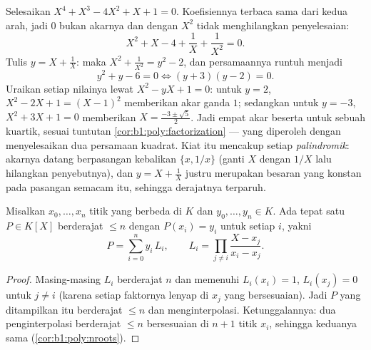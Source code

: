 \begin{example}\label{ex:b1:poly:palindrome}
Selesaikan $X^4 + X^3 - 4X^2 + X + 1 = 0$. Koefisiennya terbaca
sama dari kedua arah, jadi $0$ bukan akarnya dan  dengan
$X^2$ tidak menghilangkan penyelesaian:
\[
X^2 + X - 4 + \frac1X + \frac1{X^2} = 0 .
\]
Tulis $y = X + \frac1X$: maka $X^2 + \frac1{X^2} = y^2 - 2$, dan
persamaannya runtuh menjadi
\[
y^2 + y - 6 = 0 \iff (y + 3)(y - 2) = 0 .
\]
Uraikan setiap nilainya lewat $X^2 - yX + 1 = 0$: untuk $y = 2$, $X^2 -
2X + 1 = (X - 1)^2$ memberikan akar ganda $1$; sedangkan untuk $y = -3$,
$X^2 + 3X + 1 = 0$ memberikan $X = \frac{-3 \pm \sqrt5}2$. Jadi empat akar
beserta  untuk sebuah kuartik, sesuai tuntutan
\cref{cor:b1:poly:factorization} --- yang diperoleh dengan menyelesaikan
dua persamaan kuadrat. Kiat itu mencakup setiap 
\emph{palindromik}: akarnya datang berpasangan kebalikan $\{x, 1/x\}$
(ganti $X$ dengan $1/X$ lalu hilangkan penyebutnya), dan $y = X +
\frac1X$ justru merupakan besaran yang konstan pada pasangan semacam itu,
sehingga derajatnya terparuh.
\end{example}

\begin{theorem}\label{thm:b1:poly:lagrange}
Misalkan $x_0, \dots, x_n$ titik yang berbeda di $K$ dan $y_0, \dots, y_n
\in K$. Ada tepat satu $P \in K[X]$ berderajat $\leq n$ dengan
$P(x_i) = y_i$ untuk setiap $i$, yakni
\[
P = \sum_{i=0}^{n} y_i\, L_i,
\qquad
L_i = \prod_{j \neq i} \frac{X - x_j}{x_i - x_j} .
\]
\end{theorem}

\begin{proof}
Masing-masing $L_i$ berderajat $n$ dan memenuhi $L_i(x_i) = 1$, $L_i(x_j) =
0$ untuk $j \neq i$ (karena setiap faktornya lenyap di $x_j$ yang bersesuaian).
Jadi $P$ yang ditampilkan itu berderajat $\leq n$ dan menginterpolasi. Ketunggalannya:
dua  penginterpolasi berderajat $\leq n$ bersesuaian di $n+1$
titik $x_i$, sehingga keduanya sama (\cref{cor:b1:poly:nroots}).
\end{proof}

